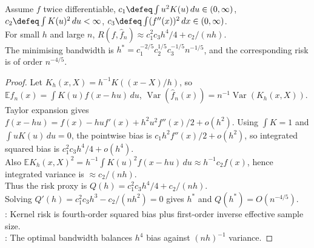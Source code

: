 \begin{theorem} \label{thm:kernel-density-risk-rate} \\
Assume $f$ twice differentiable, $c_1\defeq\int u^2K(u)\,du\in(0,\infty)$, $c_2\defeq\int K(u)^2\,du<\infty$, $c_3\defeq\int(f''(x))^2\,dx\in(0,\infty)$.\\
For small $h$ and large $n$, $R(f,\widehat f_n)\approx c_1^2c_3h^4/4+c_2/(nh)$.\\
The minimising bandwidth is $h^*=c_1^{-2/5}c_2^{1/5}c_3^{-1/5}n^{-1/5}$, and the corresponding risk is of order $n^{-4/5}$.
\begin{proof} Let $K_h(x,X)=h^{-1}K((x-X)/h)$, so $\mathbb{E}\widehat f_n(x)=\int K(u)f(x-hu)\,du$, $\operatorname{Var}(\widehat f_n(x))=n^{-1}\operatorname{Var}(K_h(x,X))$.\\
Taylor expansion gives $f(x-hu)=f(x)-hu f'(x)+h^2u^2f''(x)/2+o(h^2)$. Using $\int K=1$ and $\int uK(u)\,du=0$, the pointwise bias is $c_1h^2f''(x)/2+o(h^2)$, so integrated squared bias is $c_1^2c_3h^4/4+o(h^4)$.\\
Also $\mathbb{E}K_h(x,X)^2=h^{-1}\int K(u)^2f(x-hu)\,du\approx h^{-1}c_2f(x)$, hence integrated variance is $\approx c_2/(nh)$.\\
Thus the risk proxy is $Q(h)=c_1^2c_3h^4/4+c_2/(nh)$.\\
Solving $Q'(h)=c_1^2c_3h^3-c_2/(nh^2)=0$ gives $h^*$ and $Q(h^*)=O(n^{-4/5})$.\\
: Kernel risk is fourth-order squared bias plus first-order inverse effective sample size.\\
: The optimal bandwidth balances $h^4$ bias against $(nh)^{-1}$ variance.
\end{proof}
\end{theorem}

